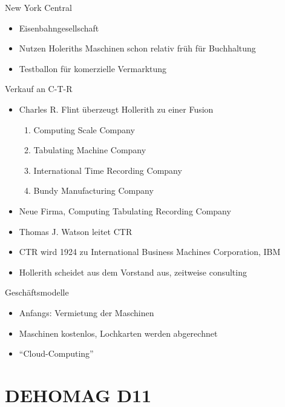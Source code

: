 \documentclass[EU2]{beamer}
\begin{document}
\begin{frame}{New York Central}
  \begin{itemize}
    \item Eisenbahngesellschaft
    \item Nutzen Holeriths Maschinen schon relativ früh für Buchhaltung
    \item Testballon für komerzielle Vermarktung
  \end{itemize}
\end{frame}

\begin{frame}{Verkauf an C-T-R}
  \begin{itemize}
    \item Charles R. Flint überzeugt Hollerith zu einer Fusion
      \begin{enumerate}
        \item Computing Scale Company
        \item Tabulating Machine Company
	\item International Time Recording Company
	\item Bundy Manufacturing Company
      \end{enumerate}
    \item Neue Firma, Computing Tabulating Recording Company
    \item Thomas J. Watson leitet CTR
    \item CTR wird 1924 zu International Business Machines Corporation, IBM
    \item Hollerith scheidet aus dem Vorstand aus, zeitweise consulting
  \end{itemize}
\end{frame}

\begin{frame}{Geschäftsmodelle}
  \begin{itemize}
    \item Anfangs: Vermietung der Maschinen
    \item Maschinen kostenlos, Lochkarten werden abgerechnet
    \item \enquote{Cloud-Computing}
  \end{itemize}
\end{frame}

\section{DEHOMAG D11}
\end{document}
